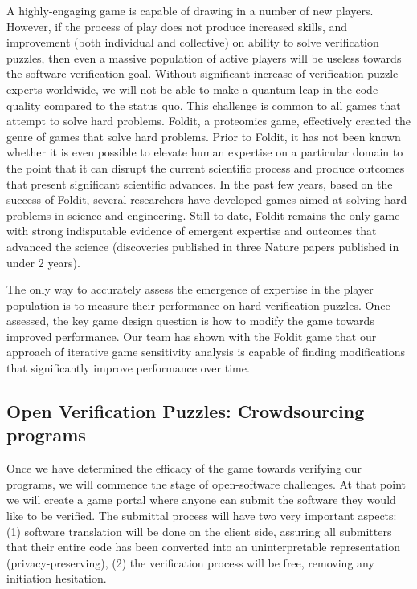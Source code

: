 \documentclass[preprint]{sig-alternate}
\begin{document}
A highly-engaging game is capable of drawing in a number of new
players.  However, if the process of play does not produce increased
skills, and improvement (both individual and collective) on ability to
solve verification puzzles, then even a massive population of active
players will be useless towards the software verification goal.
Without significant increase of verification puzzle experts worldwide,
we will not be able to make a quantum leap in the code quality
compared to the status quo.  This challenge is common to all games
that attempt to solve hard problems.  Foldit, a proteomics game,
effectively created the genre of games that solve hard problems.
Prior to Foldit, it has not been known whether it is even possible to
elevate human expertise on a particular domain to the point that it
can disrupt the current scientific process and produce outcomes that
present significant scientific advances.  In the past few years, based
on the success of Foldit, several researchers have developed games
aimed at solving hard problems in science and engineering.  Still to
date, Foldit remains the only game with strong indisputable evidence
of emergent expertise and outcomes that advanced the science
(discoveries published in three Nature papers published in under 2
years).

The only way to accurately assess the emergence of expertise in the
player population is to measure their performance on hard verification
puzzles.  Once assessed, the key game design question is how to modify
the game towards improved performance.  Our team has shown with the
Foldit game that our approach of iterative game sensitivity analysis
is capable of finding modifications that significantly improve
performance over time.


\subsection{Open Verification Puzzles: Crowdsourcing programs}

Once we have determined the efficacy of the game towards verifying our
programs, we will commence the stage of open-software challenges.  At
that point we will create a game portal where anyone can submit the
software they would like to be verified.  The submittal process will
have two very important aspects: (1) software translation will be done
on the client side, assuring all submitters that their entire code has
been converted into an uninterpretable representation
(privacy-preserving), (2) the verification process will be free,
removing any initiation hesitation.
\end{document}

